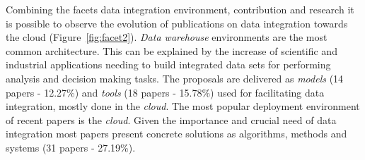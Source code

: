 Combining the facets data integration environment, contribution
and research it is possible to observe  the evolution of publications on data integration towards the cloud (Figure~\ref{fig:facet2}).  {\em Data warehouse} environments are the most common architecture. This can be explained by the increase of scientific  and industrial applications needing to build integrated  data sets for performing analysis and decision making tasks. The proposals are delivered as {\em models}  (14  papers - 12.27\%)  and {\em tools} (18
papers - 15.78\%)  used for facilitating data integration, mostly done in the {\em cloud}.  The most popular deployment environment of recent papers is the {\em cloud}. Given the importance and crucial need of data integration  most papers present concrete solutions as algorithms, methods and systems (31 papers - 27.19\%).








 
